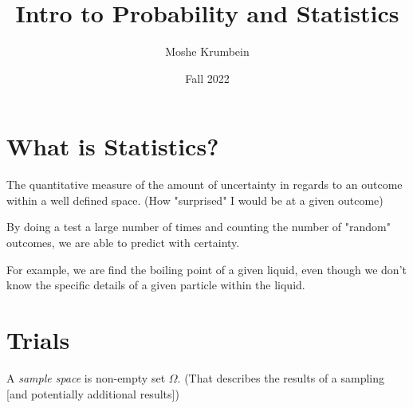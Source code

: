 \documentclass[00_complete]{subfiles}
\title{Intro to Probability and Statistics}
\author{Moshe Krumbein}
\date{Fall 2022}
\begin{document}

\section{What is Statistics?}

The quantitative measure of the amount of uncertainty in regards to an outcome
within a well defined space. (How "surprised" I would be at a given outcome)

By doing a test a large number of times and counting the number of "random"
outcomes, we are able to predict with certainty.

For example, we are find the boiling point of a given liquid, even though we
don't know the specific details of a given particle within the liquid.

\section{Trials}
\begin{definition}
   A \emph{sample space} is non-empty set $\Omega$. (That describes the results
   of a sampling [and potentially additional results])
\end{definition}
\end{document}
